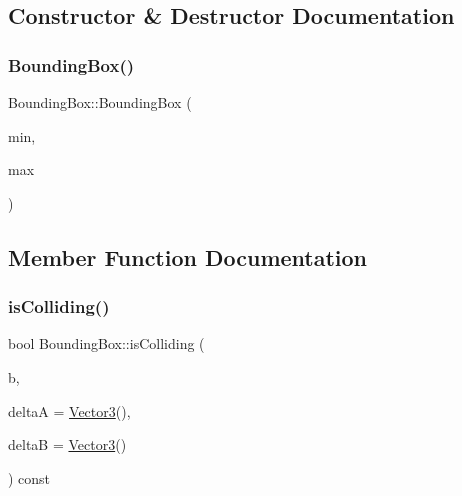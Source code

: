 \subsection{Constructor \& Destructor Documentation}
\mbox{\label{class_bounding_box_a06eeefc2e788138dc5e9f5da7a7c8a94}} 
\subsubsection{\texorpdfstring{Bounding\+Box()}{BoundingBox()}}
{\footnotesize\ttfamily Bounding\+Box\+::\+Bounding\+Box (\begin{DoxyParamCaption}\item[{\hyperlink{class_vector3}{Vector3}}]{min,  }\item[{\hyperlink{class_vector3}{Vector3}}]{max }\end{DoxyParamCaption})\hspace{0.3cm}{\ttfamily [inline]}}



\subsection{Member Function Documentation}
\mbox{\label{class_bounding_box_ad8d240571651b64a2965f202d8ed99bd}} 
\subsubsection{\texorpdfstring{is\+Colliding()}{isColliding()}}
{\footnotesize\ttfamily bool Bounding\+Box\+::is\+Colliding (\begin{DoxyParamCaption}\item[{const \hyperlink{class_bounding_box}{Bounding\+Box}}]{b,  }\item[{\hyperlink{class_vector3}{Vector3}}]{deltaA = {\ttfamily \hyperlink{class_vector3}{Vector3}()},  }\item[{\hyperlink{class_vector3}{Vector3}}]{deltaB = {\ttfamily \hyperlink{class_vector3}{Vector3}()} }\end{DoxyParamCaption}) const\hspace{0.3cm}{\ttfamily [inline]}}

